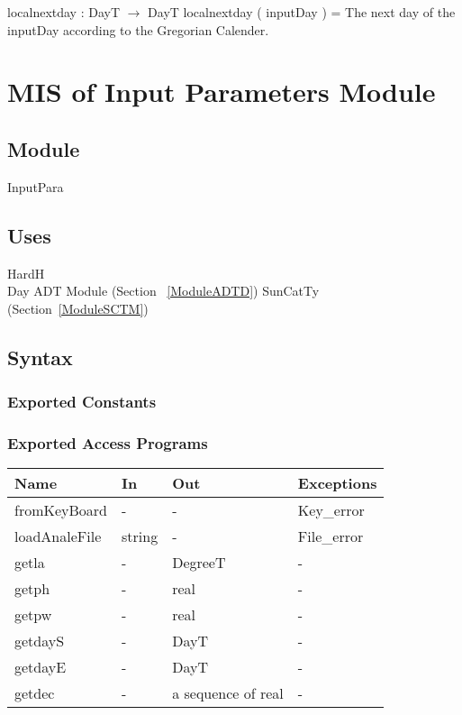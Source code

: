 \documentclass[12pt, titlepage]{article}
\begin{document}
localnextday : DayT $\rightarrow$ DayT
localnextday ( inputDay ) = The next day of the  inputDay according to the Gregorian Calender.

\newpage


\section{MIS of Input Parameters Module} \label{ModuleIP} 

\subsection{Module}
InputPara

\subsection{Uses}
HardH\\
Day ADT Module (Section ~\ref{ModuleADTD})
SunCatTy (Section~\ref{ModuleSCTM}) \\
\subsection{Syntax}

\subsubsection{Exported Constants}


\subsubsection{Exported Access Programs}

\begin{center}
\begin{tabular}{p{4cm} p{2cm} p{4cm} p{2cm}}
\hline
\textbf{Name} & \textbf{In} & \textbf{Out} & \textbf{Exceptions} \\
\hline 
fromKeyBoard & - & - & Key\_error \\
loadAnaleFile & string & - & File\_error \\
getla & - & DegreeT & - \\
getph & - & real & - \\
getpw & - & real & - \\
getdayS & - & DayT & - \\
getdayE & - & DayT & - \\
getdec & - & a sequence of real & - \\


\hline
\end{tabular}
\end{center}
\end{document}
